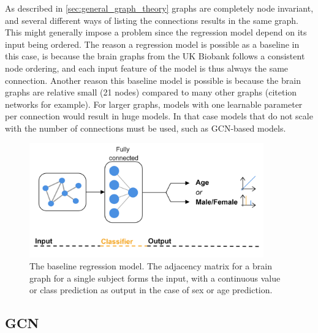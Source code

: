 As described in \ref{sec:general_graph_theory} graphs are completely node invariant, and several different ways of listing the connections results in the same graph. This might generally impose a problem since the regression model depend on its input being ordered. The reason a regression model is possible as a baseline in this case, is because the brain graphs from the UK Biobank follows a consistent node ordering, and each input feature of the model is thus always the same connection. Another reason this baseline model is possible is because the brain graphs are relative small (21 nodes) compared to many other graphs (citetion networks for example). For larger graphs, models with one learnable parameter per connection would result in huge models. In that case models that do not scale with the number of connections must be used, such as GCN-based models. 

%         

\begin{figure}[H]
    \centering
    \includegraphics[width=0.9\textwidth]{chapters/images_methods/ffnn_v2.png}
    \caption{The baseline regression model. The adjacency matrix for a brain graph for a single subject forms the input, with a continuous value or class prediction as output in the case of sex or age prediction.}
    \label{fig:Graph_class_baseline}
\end{figure}

\subsection{GCN}

